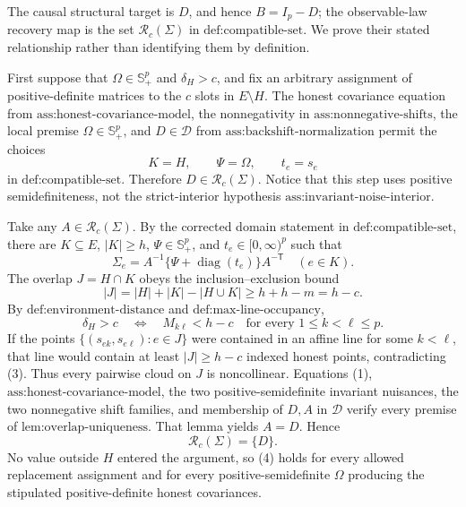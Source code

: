 The causal structural target is \(D\), and hence \(B=I_p-D\); the observable-law recovery map is the set \(\mathcal R_c(\Sigma)\) in \(\text{def:compatible-set}\).  We prove their stated relationship rather than identifying them by definition.

First suppose that \(\Omega\in\mathbb S_+^p\) and \(\delta_H>c\), and fix an arbitrary assignment of positive-definite matrices to the \(c\) slots in \(E\setminus H\).  The honest covariance equation from \(\text{ass:honest-covariance-model}\), the nonnegativity in \(\text{ass:nonnegative-shifts}\), the local premise \(\Omega\in\mathbb S_+^p\), and \(D\in\mathcal D\) from \(\text{ass:backshift-normalization}\) permit the choices
\[
 K=H,\qquad \Psi=\Omega,\qquad t_e=s_e
\]
in \(\text{def:compatible-set}\).  Therefore \(D\in\mathcal R_c(\Sigma)\).  Notice that this step uses positive semidefiniteness, not the strict-interior hypothesis \(\text{ass:invariant-noise-interior}\).

Take any \(A\in\mathcal R_c(\Sigma)\).  By the corrected domain statement in \(\text{def:compatible-set}\), there are \(K\subseteq E\), \(|K|\ge h\), \(\Psi\in\mathbb S_+^p\), and \(t_e\in[0,\infty)^p\) such that
\[
 \Sigma_e=A^{-1}\{\Psi+\operatorname{diag}(t_e)\}A^{-\mathsf T}
 \quad(e\in K). \tag{1}
\]
The overlap \(J=H\cap K\) obeys the inclusion--exclusion bound
\[
 |J|=|H|+|K|-|H\cup K|
 \ge h+h-m=h-c. \tag{2}
\]
By \(\text{def:environment-distance}\) and \(\text{def:max-line-occupancy}\),
\[
 \delta_H>c
 \quad\Longleftrightarrow\quad
 M_{k\ell}<h-c\quad\text{for every }1\le k<\ell\le p. \tag{3}
\]
If the points \(\{(s_{ek},s_{e\ell}):e\in J\}\) were contained in an affine line for some \(k<\ell\), that line would contain at least \(|J|\ge h-c\) indexed honest points, contradicting (3).  Thus every pairwise cloud on \(J\) is noncollinear.  Equations (1), \(\text{ass:honest-covariance-model}\), the two positive-semidefinite invariant nuisances, the two nonnegative shift families, and membership of \(D,A\) in \(\mathcal D\) verify every premise of \(\text{lem:overlap-uniqueness}\).  That lemma yields \(A=D\).  Hence
\[
 \mathcal R_c(\Sigma)=\{D\}. \tag{4}
\]
No value outside \(H\) entered the argument, so (4) holds for every allowed replacement assignment and for every positive-semidefinite \(\Omega\) producing the stipulated positive-definite honest covariances.

